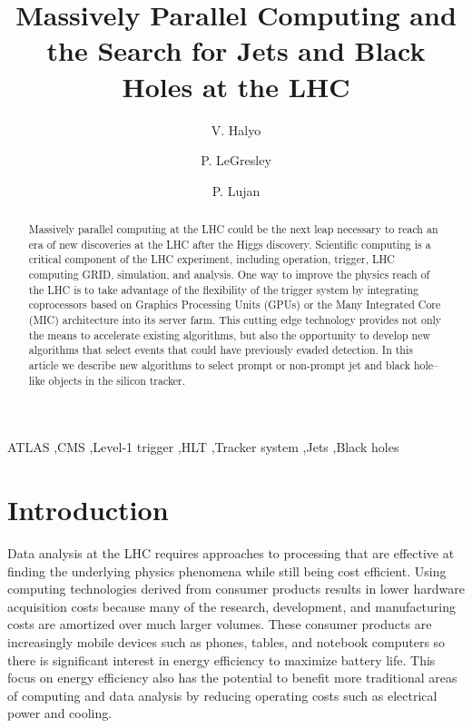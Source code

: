 \documentclass[preprint,sort&compress]{elsarticle}
\begin{document}
\begin{frontmatter}

\title{Massively Parallel Computing and the Search for Jets and Black Holes at the LHC}

\author{V. Halyo}
\author{P. LeGresley}
\author{P. Lujan}
\address{Department of Physics, Princeton University, Princeton, NJ 08544, USA}


\begin{abstract}
Massively parallel computing at the LHC could be the next leap necessary to reach an era of new discoveries at
the LHC after the Higgs discovery. Scientific computing is a critical component of the LHC experiment, including
operation, trigger, LHC computing GRID, simulation, and analysis. One way to improve the physics reach of the LHC is to
take advantage of the flexibility of the trigger system by integrating coprocessors based on Graphics Processing Units 
(GPUs) or the Many Integrated Core (MIC) architecture into its server farm. This cutting edge technology provides not 
only the means to accelerate existing algorithms, but also the opportunity to develop new algorithms that select events
 that could have previously evaded detection. In this article we describe new algorithms to select prompt or non-prompt
 jet and black hole--like objects in the silicon tracker.
\end{abstract}

\begin{keyword}
ATLAS \sep CMS \sep Level-1 trigger \sep HLT \sep Tracker system \sep Jets \sep Black holes
\end{keyword}

\end{frontmatter}

\section{Introduction} 

Data analysis at the LHC requires approaches to processing that are effective at finding the underlying physics phenomena while still being cost efficient.  Using computing technologies derived from consumer products results in lower hardware acquisition costs because many of the research, development, and manufacturing costs are amortized over much larger volumes.  These consumer products are increasingly mobile devices such as phones, tables, and notebook computers so there is significant interest in energy efficiency to maximize battery life.  This focus on energy efficiency also has the potential to benefit more traditional areas of computing and data analysis by reducing operating costs such as electrical power and cooling.
\end{document}
